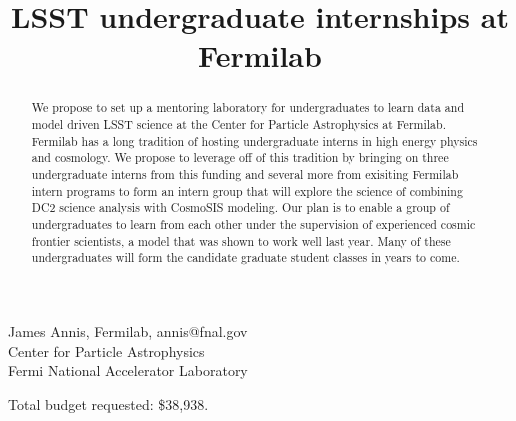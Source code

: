 \title{%
LSST undergraduate internships at Fermilab}
\date{} %


\maketitle

\vspace{-1.5cm}
\begin{center}
James Annis, Fermilab, annis@fnal.gov \\
Center for Particle Astrophysics\\
Fermi National Accelerator Laboratory
\end{center}
\vspace{1.5cm}

\begin{abstract}
\normalsize
We propose to set up a mentoring laboratory for undergraduates to
learn data and model driven LSST science at the Center for Particle
Astrophysics at Fermilab.
Fermilab has a long tradition of hosting undergraduate
interns in high energy physics and cosmology. 
We  propose to leverage off of this tradition by
bringing on three undergraduate interns from this funding
and several more from exisiting Fermilab intern programs
to form an intern group that will explore the science 
of combining DC2 science analysis with CosmoSIS modeling.
Our plan is to enable a group of undergraduates to learn from
each other under the supervision of experienced cosmic
frontier scientists, a model that was shown to work
well last year. Many of these  undergraduates will
form the candidate graduate student classes in years to come.
\end{abstract}

Total budget requested: \$38,938.\par

